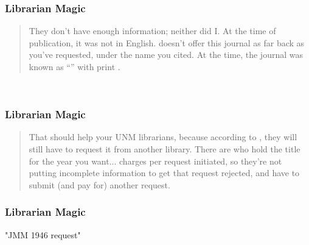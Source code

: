 \documentclass[]{beamer}
\begin{document}


\begin{frame}\frametitle{Librarian Magic}
\small{
\begin{quotation}
They don't have enough information; neither did I. At the time of publication, it was not in English.  doesn't offer this journal as far back as you've requested, under the name you cited. At the time, the journal was known as ``'' with print . 
\end{quotation}
}
\ 
\\[10pt]
\center
\href{https://translate.google.com/?sl=en&tl=ru&text=Prikladnaya\%20matematika\%20i\%20mekhanika\&op=translate}{}
\end{frame}
%
\begin{frame}\frametitle{Librarian Magic}
\small{
\begin{quotation}
That should help your UNM librarians, because according to , they will still have to request it from another library. There are  who hold the title for the year you want...  charges per request initiated, so they're not putting incomplete information to get that request rejected, and have to submit (and pay for) another request. 
\end{quotation}
}
\end{frame}
%

\begin{frame}\frametitle{Librarian Magic\jumpLittle}
\center
	\begin{overpic}[ scale = 0.225 ]
		{\pLocalGraphics "JMM 1946 request"}
	\end{overpic}
\end{frame}
\end{document}
